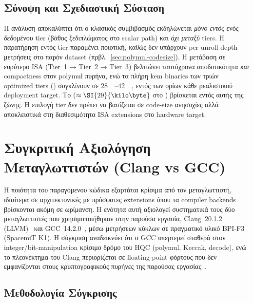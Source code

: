 \subsection{Σύνοψη και Σχεδιαστική Σύσταση}
\label{ssec:codesize-summary}

Η ανάλυση αποκαλύπτει ότι ο κλασικός συμβιβασμός  εκδηλώνεται \emph{μόνο εντός} ενός δεδομένου tier
(βάθος ξεδιπλώματος στο scalar path) και \emph{όχι μεταξύ} tiers. Η παρατήρηση εντός-tier παραμένει ποιοτική, καθώς δεν υπάρχουν per-unroll-depth μετρήσεις στο παρόν dataset (πρβλ.\ \cref{sec:polymul-codesize}).
Η μετάβαση σε ευρύτερο ISA (Tier~1 → Tier~2 → Tier~3) βελτιώνει
ταυτόχρονα αποδοτικότητα \emph{και} compactness στον polymul πυρήνα,
ενώ τα πλήρη \gls{kem} binaries των τριών optimized tiers () συγκλίνουν σε \SIrange{28}{42}{\kilo\byte}, εντός των ορίων κάθε ρεαλιστικού deployment target. Το  ($\approx\SI{29}{\kilo\byte}$ στο ) βρίσκεται εντός αυτής της ζώνης.
Η επιλογή tier δεν πρέπει να βασίζεται σε code-size ανησυχίες αλλά
αποκλειστικά στη διαθεσιμότητα ISA extensions στο hardware target.

\fi
\section{Συγκριτική Αξιολόγηση Μεταγλωττιστών (Clang vs GCC)}
\label{sec:compiler-comparison}

Η ποιότητα του παραγόμενου κώδικα εξαρτάται κρίσιμα από τον μεταγλωττιστή,
ιδιαίτερα σε αρχιτεκτονικές με πρόσφατες extensions όπου τα compiler backends
βρίσκονται ακόμη σε ωρίμανση. Η ενότητα αυτή αξιολογεί συστηματικά τους
δύο μεταγλωττιστές που χρησιμοποιήθηκαν στην παρούσα εργασία, Clang~20.1.2
(LLVM)~\cite{LLVM-20} και GCC~14.2.0~\cite{GCC-14}, μέσω μετρήσεων κύκλων σε
πραγματικό υλικό BPI-F3 (SpacemiT K1). Η σύγκριση αναδεικνύει ότι ο GCC υπερτερεί σταθερά στον
integer/bit-manipulation κρίσιμο δρόμο του HQC (polymul, Keccak, decode), ενώ
το πλεονέκτημα του Clang περιορίζεται σε floating-point φόρτους που δεν
εμφανίζονται στους κρυπτογραφικούς πυρήνες της παρούσας
εργασίας~\cite{Li-LLVM-GCC-RISCV2025,CloserInTheGap2026}.

\subsection{Μεθοδολογία Σύγκρισης}
\label{ssec:compiler-methodology}

